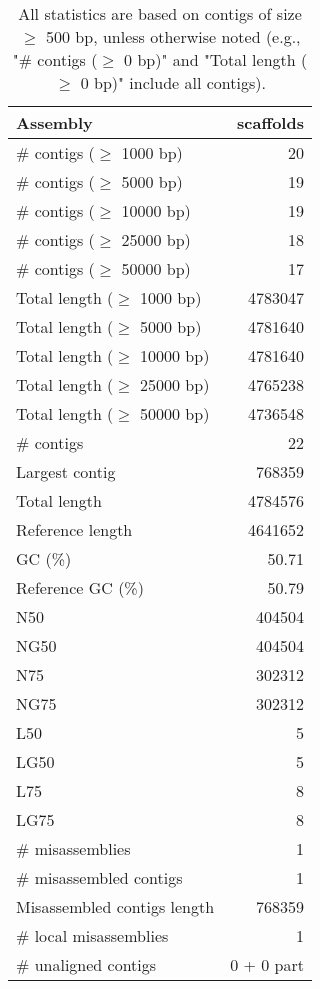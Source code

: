 \documentclass[12pt,a4paper]{article}
\begin{document}
\begin{table}[ht]
\begin{center}
\caption{All statistics are based on contigs of size $\geq$ 500 bp, unless otherwise noted (e.g., "\# contigs ($\geq$ 0 bp)" and "Total length ($\geq$ 0 bp)" include all contigs).}
\begin{tabular}{|l*{1}{|r}|}
\hline
Assembly & scaffolds \\ \hline
\# contigs ($\geq$ 1000 bp) & 20 \\ \hline
\# contigs ($\geq$ 5000 bp) & 19 \\ \hline
\# contigs ($\geq$ 10000 bp) & 19 \\ \hline
\# contigs ($\geq$ 25000 bp) & 18 \\ \hline
\# contigs ($\geq$ 50000 bp) & 17 \\ \hline
Total length ($\geq$ 1000 bp) & 4783047 \\ \hline
Total length ($\geq$ 5000 bp) & 4781640 \\ \hline
Total length ($\geq$ 10000 bp) & 4781640 \\ \hline
Total length ($\geq$ 25000 bp) & 4765238 \\ \hline
Total length ($\geq$ 50000 bp) & 4736548 \\ \hline
\# contigs & 22 \\ \hline
Largest contig & 768359 \\ \hline
Total length & 4784576 \\ \hline
Reference length & 4641652 \\ \hline
GC (\%) & 50.71 \\ \hline
Reference GC (\%) & 50.79 \\ \hline
N50 & 404504 \\ \hline
NG50 & 404504 \\ \hline
N75 & 302312 \\ \hline
NG75 & 302312 \\ \hline
L50 & 5 \\ \hline
LG50 & 5 \\ \hline
L75 & 8 \\ \hline
LG75 & 8 \\ \hline
\# misassemblies & 1 \\ \hline
\# misassembled contigs & 1 \\ \hline
Misassembled contigs length & 768359 \\ \hline
\# local misassemblies & 1 \\ \hline
\# unaligned contigs & 0 + 0 part \\ \hline

\end{tabular}
\end{center}
\end{table}
\end{document}
